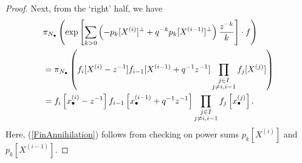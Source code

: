 \documentclass{amsart}
\newcommand{\nd}{n_\bullet}
\newcommand{\zd}{z_\bullet}
\newcommand{\La}{\Lambda}
\newcommand{\Pol}{\mathrm{Pol}}
\theoremstyle{remark}
\numberwithin{thm}{section}
\numberwithin{equation}{section}
\begin{document}
\begin{proof}
Next, from the `right' half, we have
\begin{align}
\nonumber
&\pi_{N_\bullet}\left( \exp\left[\sum_{k>0}\left( -p_k[X^{(i)}]^\perp+q^{-k}p_k[X^{(i-1)}]^\perp \right)\frac{z^{-k}}{k}  \right]\cdot f \right)\\
\label{FinAnnihilation}
&=
\pi_{N_\bullet}\left(f_i[X^{(i)}-z^{-1}]f_{i-1}[X^{(i-1)}+q^{-1}z^{-1}]\prod_{\substack{j\in I\\j\not=i,i-1}} f_j[X^{(j)}] \right)\\
\nonumber
&= f_i\left[x_{\bullet}^{(i)}-z^{-1}\right]f_{i-1}\left[x_{\bullet}^{(i-1)}+q^{-1}z^{-1}\right]
\prod_{\substack{j\in I\\j\not=i,i-1}} f_j\left[x_{\bullet}^{(j)}\right].\notag
\end{align}
Here, (\ref{FinAnnihilation}) follows from checking on power sums $p_k[X^{(i)}]$ and $p_k[X^{(i-1)}]$.
%

\end{proof}
\end{document}
